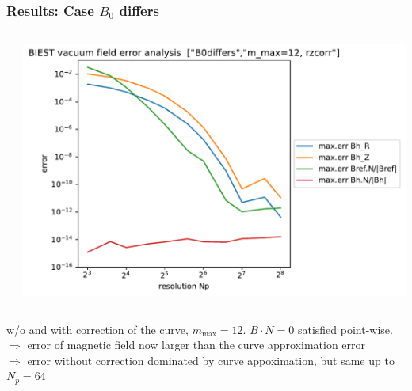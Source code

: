 \documentclass[aspectratio=169]{beamer}
\newcommand{\textc}[1]{\textcolor{iagcolor}{#1}}
\begin{document}
\begin{frame}
 \frametitle{Results: Case $B_0$ differs}
 \centering\small
 \begin{columns}[t]
  \begin{column}{0.38\textwidth}
  \end{column}\vspace{-2ex}
 \begin{column}{0.6\textwidth}
   {\includegraphics[height=0.7\textheight]{pics/BIEST_vf_err_B0differs_m_max=12_rzcorr.pdf}}
  \end{column}
 \end{columns}
 w/o and with correction of the curve, {$m_\text{max}=12$}. $B\cdot N=0$ satisfied point-wise.\\
  \textc{$\Rightarrow$ error of magnetic field now larger than the curve approximation error}\\
 {\textc{$\Rightarrow$ error without correction dominated by curve appoximation, but same up to $N_p=64$}}

\end{frame}
\end{document}

